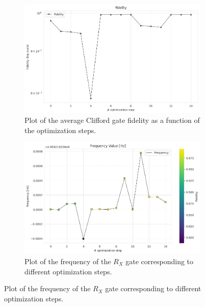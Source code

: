 \begin{figure}[h]
    \centering
    \begin{subfigure}[t]{0.45\textwidth}
        \includegraphics[width=\textwidth]{figures/png/RB_optimization/SLSQP/fidelity.png}
        \caption{Plot of the average Clifford gate fidelity as a function of the optimization steps.}
        \label{fig:SLSQP:fidelity}
    \end{subfigure}
    \hfill
    \begin{subfigure}[t]{0.45\textwidth}
        \includegraphics[width=\textwidth]{figures/png/RB_optimization/SLSQP/frequency.png}
        \caption{Plot of the frequency of the $R_X$ gate corresponding to different optimization steps.}
        \label{fig:SLSQP:frequency}
    \end{subfigure}

    \vspace{0.5cm}


\end{figure}
